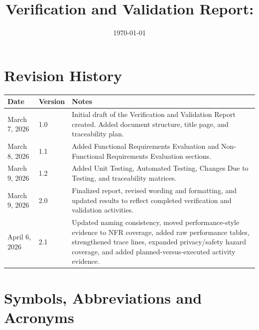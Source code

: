 \documentclass[12pt]{article}
\begin{document}
\setlength{\parindent}{0pt}
\setlength{\parskip}{0.5em}

\title{Verification and Validation Report: \progname} 
\author{\authname}
\date{\today}
	
\maketitle


\section{Revision History}

\begin{tabularx}{\textwidth}{p{3cm}p{2cm}X}
\toprule {\bf Date} & {\bf Version} & {\bf Notes}\\
\midrule
March 7, 2026 & 1.0 & Initial draft of the Verification and Validation
Report created. Added document structure, title page, and traceability plan.\\
March 8, 2026 & 1.1 & Added Functional Requirements Evaluation and
Non-Functional Requirements Evaluation sections.\\
March 9, 2026 & 1.2 & Added Unit Testing, Automated Testing, Changes Due
to Testing, and traceability matrices.\\
March 9, 2026 & 2.0 & Finalized report, revised wording and formatting,
and updated results to reflect completed verification and validation
activities.\\
April 6, 2026 & 2.1 & Updated naming consistency, moved performance-style
evidence to NFR coverage, added raw performance tables, strengthened
trace lines, expanded privacy/safety hazard coverage, and added
planned-versus-executed activity evidence.\\
\bottomrule
\end{tabularx}

\newpage

\tableofcontents

\listoftables

\newpage

\section{Symbols, Abbreviations and Acronyms}
\end{document}
